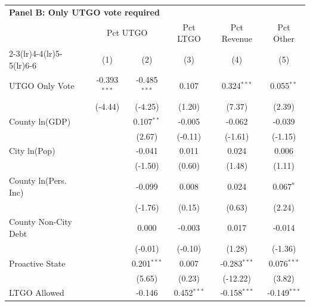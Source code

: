 \begingroup
\centering
\begin{tabular*}{\textwidth}{@{\extracolsep{\fill}}lccccc}
\multicolumn{5}{l}{\textbf{Panel B: Only UTGO vote required}}\\

\addlinespace
   \toprule
    & \multicolumn{2}{c}{Pct UTGO} & Pct LTGO & Pct Revenue & Pct Other\\
   \cmidrule(lr){2-3}\cmidrule(lr){4-4}\cmidrule(lr){5-5}\cmidrule(lr){6-6}
                               & (1)            & (2)            & (3)           & (4)            & (5)\\  
   \midrule 
   UTGO Only Vote              & -0.393$^{***}$ & -0.485$^{***}$ & 0.107         & 0.324$^{***}$  & 0.055$^{**}$\\   
                               & (-4.44)       & (-4.25)       & (1.20)       & (7.37)        & (2.39)\\   
   County ln(GDP)              &                & 0.107$^{**}$   & -0.005        & -0.062         & -0.039\\   
                               &                & (2.67)        & (-0.11)      & (-1.61)       & (-1.15)\\   
   City ln(Pop)                &                & -0.041         & 0.011         & 0.024          & 0.006\\   
                               &                & (-1.50)       & (0.60)       & (1.48)        & (1.11)\\   
   County ln(Pers. Inc)        &                & -0.099         & 0.008         & 0.024          & 0.067$^{*}$\\   
                               &                & (-1.76)       & (0.15)       & (0.63)        & (2.24)\\   
   County Non-City Debt        &                & 0.000          & -0.003        & 0.017          & -0.014\\   
                               &                & (-0.01)       & (-0.10)      & (1.28)        & (-1.36)\\   
   Proactive State             &                & 0.201$^{***}$  & 0.007         & -0.283$^{***}$ & 0.076$^{***}$\\   
                               &                & (5.65)        & (0.23)       & (-12.22)      & (3.82)\\   
   LTGO Allowed                &                & -0.146         & 0.452$^{***}$ & -0.158$^{***}$ & -0.149$^{***}$\\   

\end{tabular*}
